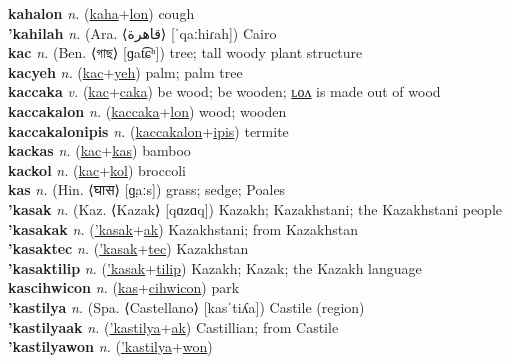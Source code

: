 \textbf{kahalon} \textit{n.} (\hyperref[kaha]{kaha}+\hyperref[lon]{lon})
cough \label{kahalon} \\
\textbf{'kahilah} \textit{n.} (Ara. ⟨قاهرة⟩ [ˈqaːhiɾah])
Cairo \label{'kahilah} \\
\textbf{kac} \textit{n.} (Ben. ⟨গাছ⟩ [ɡat͡ɕʰ])
tree; tall woody plant structure \label{kac} \\
\textbf{kacyeh} \textit{n.} (\hyperref[kac]{kac}+\hyperref[yeh]{yeh})
palm; palm tree \label{kacyeh} \\
\textbf{kaccaka} \textit{v.} (\hyperref[kac]{kac}+\hyperref[caka]{caka})
be wood; be wooden; \hyperref[kaccakalon]{ʟᴏᴧ} is made out of wood \label{kaccaka} \\
\textbf{kaccakalon} \textit{n.} (\hyperref[kaccaka]{kaccaka}+\hyperref[lon]{lon})
wood; wooden \label{kaccakalon} \\
\textbf{kaccakalonipis} \textit{n.} (\hyperref[kaccakalon]{kaccakalon}+\hyperref[ipis]{ipis})
termite \label{kaccakalonipis} \\
\textbf{kackas} \textit{n.} (\hyperref[kac]{kac}+\hyperref[kas]{kas})
bamboo \label{kackas} \\
\textbf{kackol} \textit{n.} (\hyperref[kac]{kac}+\hyperref[kol]{kol})
broccoli \label{kackol} \\
\textbf{kas} \textit{n.} (Hin. ⟨घास⟩ [ɡ̤aːs])
grass; sedge; Poales \label{kas} \\
\textbf{'kasak} \textit{n.} (Kaz. ⟨Kazak⟩ [qɑzɑq])
Kazakh; Kazakhstani; the Kazakhstani people \label{'kasak} \\
\textbf{'kasakak} \textit{n.} (\hyperref['kasak]{'kasak}+\hyperref[ak]{ak})
Kazakhstani; from Kazakhstan \label{'kasakak} \\
\textbf{'kasaktec} \textit{n.} (\hyperref['kasak]{'kasak}+\hyperref[tec]{tec})
Kazakhstan \label{'kasaktec} \\
\textbf{'kasaktilip} \textit{n.} (\hyperref['kasak]{'kasak}+\hyperref[tilip]{tilip})
Kazakh; Kazak; the Kazakh language \label{'kasaktilip} \\
\textbf{kascihwicon} \textit{n.} (\hyperref[kas]{kas}+\hyperref[cihwicon]{cihwicon})
park \label{kascihwicon} \\
\textbf{'kastilya} \textit{n.} (Spa. ⟨Castellano⟩ [kasˈtiʎa])
Castile (region) \label{'kastilya} \\
\textbf{'kastilyaak} \textit{n.} (\hyperref['kastilya]{'kastilya}+\hyperref[ak]{ak})
Castillian; from Castile \label{'kastilyaak} \\
\textbf{'kastilyawon} \textit{n.} (\hyperref['kastilya]{'kastilya}+\hyperref[won]{won})
